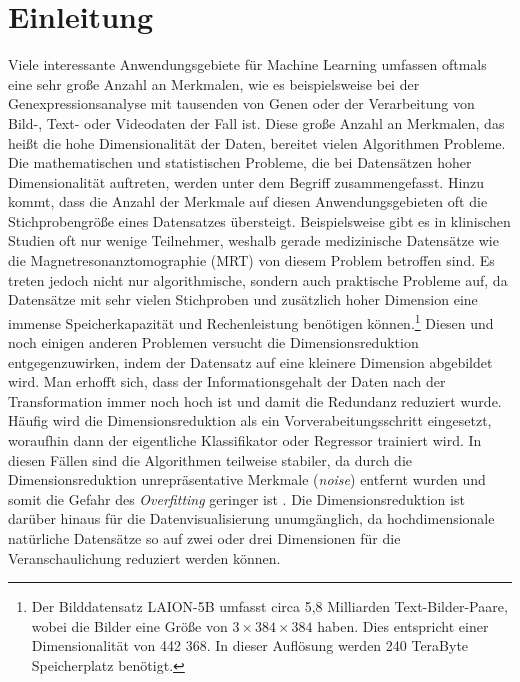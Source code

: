 \chapter{Einleitung}
\label{ch:Enleitung}

Viele interessante Anwendungsgebiete für Machine Learning umfassen oftmals eine sehr große Anzahl
an Merkmalen, wie es beispielsweise bei der Genexpressionsanalyse mit tausenden von Genen \parencite{Parmigiani.2003} oder der Verarbeitung von Bild-, Text- oder Videodaten der Fall ist. Diese
große Anzahl an Merkmalen, das heißt die hohe Dimensionalität der Daten, bereitet vielen
Algorithmen Probleme. Die mathematischen und statistischen Probleme, die bei Datensätzen hoher
Dimensionalität auftreten, werden unter dem Begriff  \parencite{Aggarwal.2001} zusammengefasst. Hinzu kommt, dass die Anzahl der Merkmale auf diesen
Anwendungsgebieten oft die Stichprobengröße eines Datensatzes übersteigt. Beispielsweise gibt es in
klinischen Studien oft nur wenige Teilnehmer, weshalb gerade medizinische Datensätze wie die
Magnetresonanztomographie (MRT) von diesem Problem betroffen sind. Es treten jedoch nicht nur
algorithmische, sondern auch praktische Probleme auf, da Datensätze mit sehr vielen Stichproben und
zusätzlich hoher Dimension eine immense Speicherkapazität und Rechenleistung benötigen
können.\footnote{Der Bilddatensatz LAION-5B umfasst circa 5,8 Milliarden Text-Bilder-Paare, wobei
	die Bilder eine Größe von $3 \times 384 \times 384$ haben. Dies entspricht einer Dimensionalität
	von 442 368. In dieser Auflösung werden 240 TeraByte Speicherplatz benötigt.}
Diesen und noch einigen anderen Problemen versucht die Dimensionsreduktion entgegenzuwirken, indem
der Datensatz auf eine kleinere Dimension abgebildet wird. Man erhofft sich, dass der
Informationsgehalt der Daten nach der Transformation immer noch hoch ist und damit die Redundanz
reduziert wurde. Häufig wird die Dimensionsreduktion als ein Vorverabeitungsschritt eingesetzt,
woraufhin dann der eigentliche Klassifikator oder Regressor trainiert wird. In diesen Fällen sind
die Algorithmen teilweise stabiler, da durch die Dimensionsreduktion unrepräsentative Merkmale
(\textit{noise}) entfernt wurden und somit die Gefahr des \textit{Overfitting} geringer ist \parencites[siehe]{Plastria.2008}{MustafaAbdulSalam.2021}. Die Dimensionsreduktion ist darüber hinaus
für die Datenvisualisierung unumgänglich, da hochdimensionale natürliche Datensätze so auf zwei
oder drei Dimensionen für die Veranschaulichung reduziert werden können.

